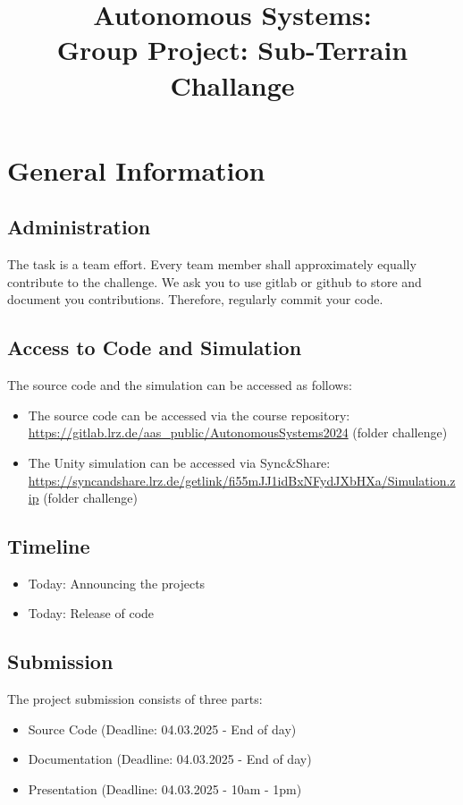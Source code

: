 \documentclass{article}
\title{Autonomous Systems: \\ Group Project: Sub-Terrain Challange}
\date{}
\begin{document}
\maketitle
\pagestyle{fancy}

\section{General Information}
\subsection{Administration}
The task is a team effort. Every team member shall approximately equally contribute to the challenge. We ask you to use gitlab or github to store and document you contributions. Therefore, regularly commit your code. 

\subsection{Access to Code and Simulation}
The source code and the simulation can be accessed as follows:
\begin{itemize}
\item The source code can be accessed via the course repository: \url{https://gitlab.lrz.de/aas_public/AutonomousSystems2024} (folder challenge)
\item The Unity simulation can be accessed via Sync\&Share: \url{https://syncandshare.lrz.de/getlink/fi55mJJ1idBxNFydJXbHXa/Simulation.zip} (folder challenge)
\end{itemize}

\subsection{Timeline}
\begin{itemize}
\item Today: Announcing the projects
\item Today: Release of code
\end{itemize}
\subsection{Submission}
The project submission consists of three parts:
\begin{itemize}
\item Source Code (Deadline: 04.03.2025 - End of day)
\item Documentation (Deadline: 04.03.2025 - End of day)
\item Presentation (Deadline: 04.03.2025 - 10am - 1pm)
\end{itemize}
\end{document}
